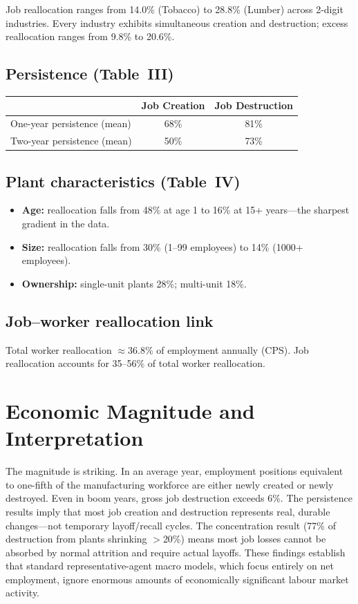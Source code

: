 Job reallocation ranges from 14.0\% (Tobacco) to 28.8\% (Lumber) across
2-digit industries. Every industry exhibits simultaneous creation and
destruction; excess reallocation ranges from 9.8\% to 20.6\%.

\subsection*{Persistence (Table~III)}

\begin{center}
\begin{tabular}{lcc}
\toprule
 & \textbf{Job Creation} & \textbf{Job Destruction} \\
\midrule
One-year persistence (mean) & 68\% & 81\% \\
Two-year persistence (mean) & 50\% & 73\% \\
\bottomrule
\end{tabular}
\end{center}

\subsection*{Plant characteristics (Table~IV)}

\begin{itemize}
  \item \textbf{Age:} reallocation falls from 48\% at age 1 to 16\% at
    15+ years---the sharpest gradient in the data.
  \item \textbf{Size:} reallocation falls from 30\% (1--99 employees) to
    14\% (1000+ employees).
  \item \textbf{Ownership:} single-unit plants 28\%; multi-unit 18\%.
\end{itemize}

\subsection*{Job--worker reallocation link}

Total worker reallocation $\approx$36.8\% of employment annually (CPS).
Job reallocation accounts for 35--56\% of total worker reallocation.

\section{Economic Magnitude and Interpretation}

The magnitude is striking. In an average year, employment positions equivalent
to one-fifth of the manufacturing workforce are either newly created or newly
destroyed. Even in boom years, gross job destruction exceeds 6\%. The
persistence results imply that most job creation and destruction represents
real, durable changes---not temporary layoff/recall cycles. The concentration
result (77\% of destruction from plants shrinking $>$20\%) means most job
losses cannot be absorbed by normal attrition and require actual layoffs.
These findings establish that standard representative-agent macro models,
which focus entirely on net employment, ignore enormous amounts of
economically significant labour market activity.

